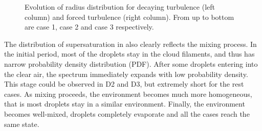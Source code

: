 \begin{figure}[H]\ContinuedFloat
{}
\caption{Evolution of radius distribution for decaying turbulence (left column)
and forced turbulence (right column). From up to bottom are case 1, case 2 and
case 3 respectively.}\label{fig:rad_distri} \end{figure}

The distribution of supersaturation in  also clearly
reflects the mixing process. In the initial period, most of the droplets stay
in the cloud filaments, and thus has narrow probability density distribution
(PDF). After some droplets entering into the clear air, the spectrum
immediately expands with low probability density. This stage could be observed
in D2 and D3, but extremely short for the rest cases. As mixing proceeds, the
environment becomes much more homogeneous, that is most droplets stay in a
similar environment. Finally, the environment becomes well-mixed, droplets
completely evaporate and all the cases reach the same state.


